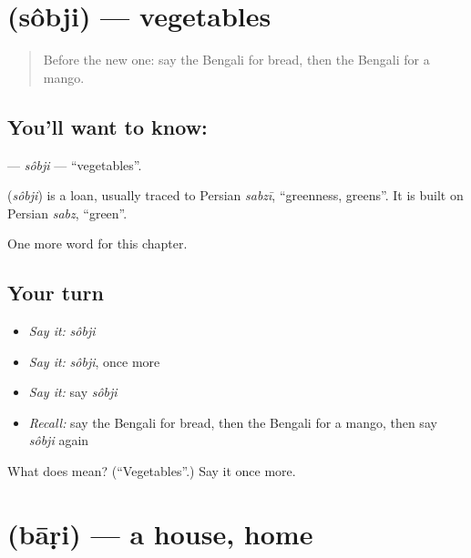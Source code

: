 \section[\texorpdfstring{\bn{সবজি} (sôbji)}{সবজি (sôbji)}]{ (sôbji) — vegetables}

\label{lesson:BN-C59-sobji}



\begin{quote}
Before the new one: say the Bengali for bread, then the Bengali for a mango.
\end{quote}

\subsection*{You'll want to know: }
\textbf{} — \emph{sôbji} — \textquotedblleft{}vegetables\textquotedblright{}.

\begin{cousinweb}
\textbf{} (\emph{sôbji}) is a loan, usually traced to Persian \emph{sabzī}, \textquotedblleft{}greenness, greens\textquotedblright{}. It is built on Persian \emph{sabz}, \textquotedblleft{}green\textquotedblright{}.
\end{cousinweb}

\begin{grammarlens}[title={What you've built}]
One more word for this chapter.
\end{grammarlens}

\subsection*{Your turn}
\begin{itemize}
\raggedright
  \item \emph{Say it:} \emph{sôbji}
  \item \emph{Say it:} \emph{sôbji}, once more
  \item \emph{Say it:} say \emph{sôbji}
  \item \emph{Recall:} say the Bengali for bread, then the Bengali for a mango, then say \emph{sôbji} again
\end{itemize}

\begin{tcolorbox}[breakable,colback=teal!4,colframe=teal!35!black,title={Before you move on}]
What does  mean? (\textquotedblleft{}Vegetables\textquotedblright{}.) Say it once more.
\end{tcolorbox}
\section[\texorpdfstring{\bn{বাড়ি} (bāṛi)}{বাড়ি (bāṛi)}]{ (bāṛi) — a house, home}

